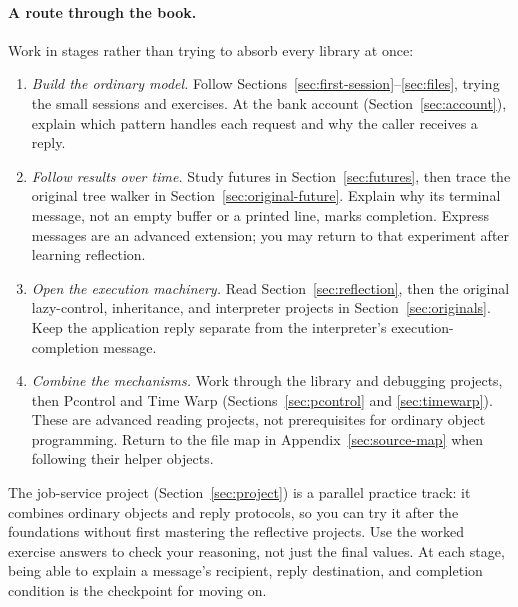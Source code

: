 \paragraph{A route through the book.}
Work in stages rather than trying to absorb every library at once:
\begin{enumerate}[nosep]
  \item \emph{Build the ordinary model.} Follow
        Sections~\ref{sec:first-session}--\ref{sec:files}, trying the
        small sessions and exercises. At the bank account
        (Section~\ref{sec:account}), explain which pattern handles each
        request and why the caller receives a reply.
  \item \emph{Follow results over time.} Study futures in
        Section~\ref{sec:futures}, then trace the original tree walker
        in Section~\ref{sec:original-future}. Explain why its terminal
        message, not an empty buffer or a printed line, marks completion.
        Express messages are an advanced extension; you may return to
        that experiment after learning reflection.
  \item \emph{Open the execution machinery.} Read
        Section~\ref{sec:reflection}, then the original lazy-control,
        inheritance, and interpreter projects in
        Section~\ref{sec:originals}. Keep the application reply separate
        from the interpreter's execution-completion message.
  \item \emph{Combine the mechanisms.} Work through the library and
        debugging projects, then Pcontrol and Time Warp
        (Sections~\ref{sec:pcontrol} and \ref{sec:timewarp}).
        These are advanced reading projects, not prerequisites for
        ordinary object programming. Return to the file map in
        Appendix~\ref{sec:source-map} when following their helper objects.
\end{enumerate}
The job-service project (Section~\ref{sec:project}) is a parallel practice
track: it combines ordinary objects and reply protocols, so you can try
it after the foundations without first mastering the reflective projects.
Use the worked exercise answers to check your reasoning, not just the
final values. At each stage, being able to explain a message's recipient,
reply destination, and completion condition is the checkpoint for moving on.

